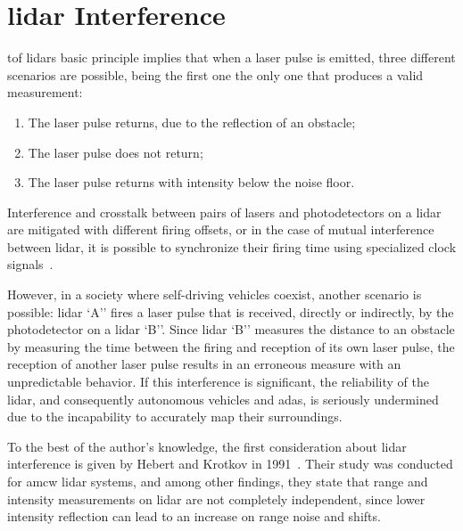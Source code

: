\section{\ac{lidar} Interference}
\label{sec:sota:lidar-interference}
\ac{tof} \ac{lidar}s basic principle implies that when a \ac{laser} pulse is emitted, three different scenarios are possible, being the first one the only one that produces a valid measurement:

\begin{enumerate}
\item The \ac{laser} pulse returns, due to the reflection of an obstacle;
\item The \ac{laser} pulse does not return;
\item The \ac{laser} pulse returns with intensity below the noise floor.
\end{enumerate}

Interference and crosstalk between pairs of \acp{laser} and photodetectors on a \ac{lidar} are mitigated with different firing offsets, or in the case of mutual interference between \ac{lidar}, it is possible to synchronize their firing time using specialized clock signals~\cite{vlp16}.

However, in a society where self-driving vehicles coexist, another scenario is possible: \ac{lidar} `A'' fires a \ac{laser} pulse that is received, directly or indirectly, by the photodetector on a \ac{lidar} `B''. Since \ac{lidar} `B'' measures the distance to an obstacle by measuring the time between the firing and reception of its own \ac{laser} pulse, the reception of another \ac{laser} pulse results in an erroneous measure with an unpredictable behavior. If this interference is significant, the reliability of the \ac{lidar}, and consequently autonomous vehicles and \ac{adas}, is seriously undermined due to the incapability to accurately map their surroundings.



To the best of the author's knowledge, the first consideration about \ac{lidar} interference is given by Hebert and Krotkov in 1991~\cite{Hebert}. Their study was conducted for \ac{amcw} \ac{lidar} systems, and among other findings, they state that range and intensity measurements on \ac{lidar} are not completely independent, since lower intensity reflection can lead to an increase on range noise and shifts. 

